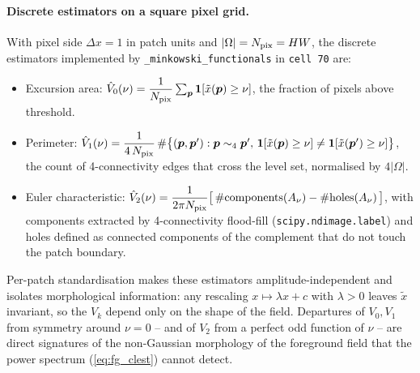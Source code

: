 \documentclass[11pt]{article}
\theoremstyle{definition}
\begin{document}
\paragraph{Discrete estimators on a square pixel grid.}
With pixel side $\Delta x=1$ in patch units and $|\Omega|=N_{\rm pix}=HW$,
the discrete estimators implemented by \texttt{\_minkowski\_functionals}
in \texttt{cell~70} are:
\begin{itemize}[leftmargin=2.0em,itemsep=0.15em]
  \item Excursion area:
    $\hat V_0(\nu)=\dfrac{1}{N_{\rm pix}}
      \sum_{\bm p}\mathbf 1[\tilde x(\bm p)\ge\nu]$,
    the fraction of pixels above threshold.
  \item Perimeter:
    $\hat V_1(\nu)=\dfrac{1}{4\,N_{\rm pix}}\,
      \#\bigl\{(\bm p,\bm p'):\bm p\sim_4\bm p',\,
      \mathbf 1[\tilde x(\bm p)\ge\nu]
      \neq\mathbf 1[\tilde x(\bm p')\ge\nu]\bigr\}$,
    the count of 4-connectivity edges that cross the level set,
    normalised by $4|\Omega|$.
  \item Euler characteristic:
    $\hat V_2(\nu)=\dfrac{1}{2\pi N_{\rm pix}}
      \bigl[\,\#\mathrm{components}(A_\nu)
              - \#\mathrm{holes}(A_\nu)\,\bigr]$,
    with components extracted by 4-connectivity flood-fill
    (\texttt{scipy.ndimage.label}) and holes defined as connected
    components of the complement that do not touch the patch boundary.
\end{itemize}
Per-patch standardisation makes these estimators amplitude-independent
and isolates morphological information: any rescaling
$x\mapsto\lambda x+c$ with $\lambda>0$ leaves $\tilde x$ invariant, so the
$V_k$ depend only on the shape of the field. Departures of $V_0,V_1$ from
symmetry around $\nu=0$ -- and of $V_2$ from a perfect odd function of
$\nu$ -- are direct signatures of the non-Gaussian morphology of the
foreground field that the power spectrum (\ref{eq:fg_clest}) cannot
detect.
\end{document}
